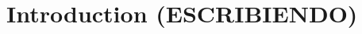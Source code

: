 \documentclass[../main.tex]{subfiles}
\begin{document}

\section{Introduction (ESCRIBIENDO)}
\label{sec:introduction}







\end{document}
